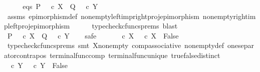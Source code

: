 \begin{isabellebody}
\ \ \isamarkupfalse%
\ \isamarkupfalse%
\ eqs{\isacharcolon}{\kern0pt}\ {\isachardoublequoteopen}P\ {\isacharequal}{\kern0pt}\ {\isasymf}\ {\isasymcirc}\isactrlsub c\ {\isasymbeta}\isactrlbsub X\isactrlesub \ {\isasymand}\ Q\ {\isacharequal}{\kern0pt}\ {\isasymf}\ {\isasymcirc}\isactrlsub c\ {\isasymbeta}\isactrlbsub Y\isactrlesub {\isachardoublequoteclose}\isanewline
\ \ \ \ \isamarkupfalse%
\ assms\ epimorphism{\isacharunderscore}{\kern0pt}def{}\ nonempty{\isacharunderscore}{\kern0pt}left{\isacharunderscore}{\kern0pt}imp{\isacharunderscore}{\kern0pt}right{\isacharunderscore}{\kern0pt}proj{\isacharunderscore}{\kern0pt}epimorphism\ nonempty{\isacharunderscore}{\kern0pt}right{\isacharunderscore}{\kern0pt}imp{\isacharunderscore}{\kern0pt}left{\isacharunderscore}{\kern0pt}proj{\isacharunderscore}{\kern0pt}epimorphism\isanewline
\ \ \ \ \isamarkupfalse%
\ {\isacharparenleft}{\kern0pt}typecheck{\isacharunderscore}{\kern0pt}cfuncs{\isacharunderscore}{\kern0pt}prems{\isacharcomma}{\kern0pt}\ blast{\isacharparenright}{\kern0pt}\isanewline
\ \ \isamarkupfalse%
\ \isamarkupfalse%
\ {\isachardoublequoteopen}P\ {\isasymnoteq}\ {\isasymt}\ {\isasymcirc}\isactrlsub c\ {\isasymbeta}\isactrlbsub X\isactrlesub \ {\isasymand}\ Q\ {\isasymnoteq}\ {\isasymt}\ {\isasymcirc}\isactrlsub c\ {\isasymbeta}\isactrlbsub Y\isactrlesub {\isachardoublequoteclose}\isanewline
\ \ \isamarkupfalse%
\ safe\isanewline
\ \ \ \ \isamarkupfalse%
\ {\isachardoublequoteopen}{\isasymf}\ {\isasymcirc}\isactrlsub c\ {\isasymbeta}\isactrlbsub X\isactrlesub \ {\isacharequal}{\kern0pt}\ {\isasymt}\ {\isasymcirc}\isactrlsub c\ {\isasymbeta}\isactrlbsub X\isactrlesub \ {\isasymLongrightarrow}\ False{\isachardoublequoteclose}\isanewline
\ \ \ \ \ \ \isamarkupfalse%
\ {\isacharparenleft}{\kern0pt}typecheck{\isacharunderscore}{\kern0pt}cfuncs{\isacharunderscore}{\kern0pt}prems{\isacharcomma}{\kern0pt}\ smt\ X{\isacharunderscore}{\kern0pt}nonempty\ comp{\isacharunderscore}{\kern0pt}associative{}\ nonempty{\isacharunderscore}{\kern0pt}def\ one{\isacharunderscore}{\kern0pt}separator{\isacharunderscore}{\kern0pt}contrapos\ terminal{\isacharunderscore}{\kern0pt}func{\isacharunderscore}{\kern0pt}comp\ terminal{\isacharunderscore}{\kern0pt}func{\isacharunderscore}{\kern0pt}unique\ true{\isacharunderscore}{\kern0pt}false{\isacharunderscore}{\kern0pt}distinct{\isacharparenright}{\kern0pt}\isanewline
\ \ \ \ \isamarkupfalse%
\ {\isachardoublequoteopen}{\isasymf}\ {\isasymcirc}\isactrlsub c\ {\isasymbeta}\isactrlbsub Y\isactrlesub \ {\isacharequal}{\kern0pt}\ {\isasymt}\ {\isasymcirc}\isactrlsub c\ {\isasymbeta}\isactrlbsub Y\isactrlesub \ {\isasymLongrightarrow}\ False{\isachardoublequoteclose}\isanewline

\end{isabellebody}

